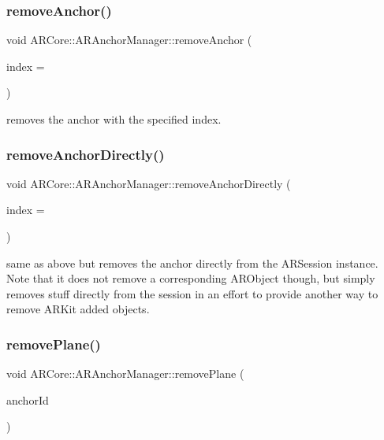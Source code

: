 \subsubsection{\texorpdfstring{remove\+Anchor()}{removeAnchor()}\hspace{0.1cm}{\footnotesize\ttfamily [2/2]}}
{\footnotesize\ttfamily void A\+R\+Core\+::\+A\+R\+Anchor\+Manager\+::remove\+Anchor (\begin{DoxyParamCaption}\item[{int}]{index = {} }\end{DoxyParamCaption})}



removes the anchor with the specified index. 

\mbox{\label{class_a_r_core_1_1_a_r_anchor_manager_aeaa578780e37129fb899b3f5a762af63}} 
\subsubsection{\texorpdfstring{remove\+Anchor\+Directly()}{removeAnchorDirectly()}}
{\footnotesize\ttfamily void A\+R\+Core\+::\+A\+R\+Anchor\+Manager\+::remove\+Anchor\+Directly (\begin{DoxyParamCaption}\item[{int}]{index = {} }\end{DoxyParamCaption})}

same as above but removes the anchor directly from the A\+R\+Session instance. Note that it does not remove a corresponding A\+R\+Object though, but simply removes stuff directly from the session in an effort to provide another way to remove A\+R\+Kit added objects. \mbox{\label{class_a_r_core_1_1_a_r_anchor_manager_a65690e39286b733631eb52c8e740bc79}} 
\subsubsection{\texorpdfstring{remove\+Plane()}{removePlane()}\hspace{0.1cm}{\footnotesize\ttfamily [1/2]}}
{\footnotesize\ttfamily void A\+R\+Core\+::\+A\+R\+Anchor\+Manager\+::remove\+Plane (\begin{DoxyParamCaption}\item[{N\+S\+U\+U\+ID $\ast$}]{anchor\+Id }\end{DoxyParamCaption})}



